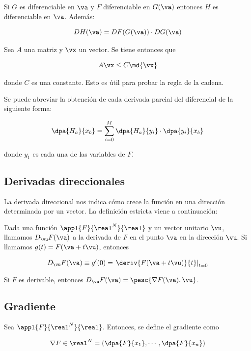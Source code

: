 \documentclass[nochap]{apuntes}
\begin{document}
\begin{theorem}
Si $G$ es diferenciable en $\va$ y $F$ diferenciable en $G(\va)$ entonces $H$ es diferenciable en $\va$. Además:

\[DH (\va) = DF(G(\va))\cdot DG(\va) \]
\end{theorem}

\begin{theorem}
Sea $A$ una matriz y $\vx$ un vector. Se tiene entonces que 

\[ A\vx \leq C\md{\vx} \]

donde $C$ es una constante. Esto es útil para probar la regla de la cadena.
\end{theorem}

Se puede abreviar la obtención de cada derivada parcial del diferencial de la siguiente forma:

\[ \dpa{H_a}{x_b} = \sum_{i=0}^M\dpa{H_a}{y_i}\cdot \dpa{y_i}{x_b} \]


donde $y_1$ es cada una de las variables de $F$.

\subsection{Derivadas direccionales}

La derivada direccional nos indica cómo crece la función en una dirección determinada por un vector. La definición estricta viene a continuación:

\begin{defn}
Dada una función $\appl{F}{\real^N}{\real}$ y un vector unitario $\vu$, llamamos $D_{\vu} F(\va)$ a la derivada de $F$ en el punto $\va$ en la dirección $\vu$. Si llamamos $g(t) = F(\va + t\vu)$, entonces

\[ D_{\vu} F(\va) \equiv g'(0) = \left.\deriv{F(\va + t\vu)}{t}\right|_{t=0} \]
\end{defn}

\begin{theorem}
Si $F$ es derivable, entonces $D_{\vu} F(\va) = \pesc{\nabla F(\va), \vu}$.
\end{theorem}

\subsection{Gradiente}
\begin{defn}[Gradiente]
Sea $\appl{F}{\real^N}{\real}$. Entonces, se define el gradiente como 

\[ \nabla F \in \real^N = \left(\dpa{F}{x_1},\cdots,\dpa{F}{x_n}\right) \]
\end{defn}
\end{document}
